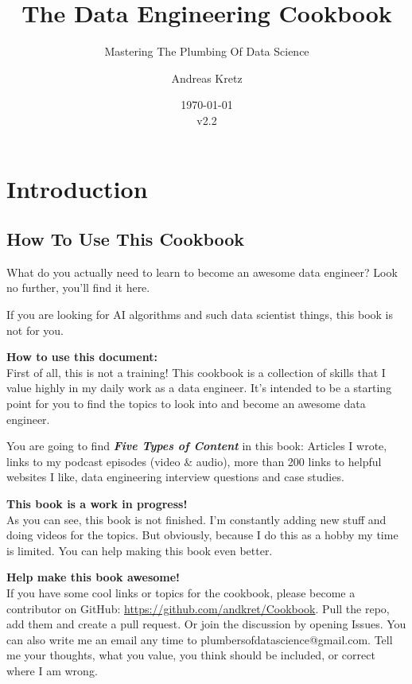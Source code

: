 \documentclass[12pt, numbers=noenddot]{scrreprt} %
\title{The Data Engineering Cookbook}
\subtitle{Mastering The Plumbing Of Data Science}
\author{Andreas Kretz}
\date{\today\\v2.2}
\begin{document}
\maketitle


\pagebreak

\setcounter{tocdepth}{3}
\tableofcontents

\pagebreak

\part{Introduction}
\chapter{How To Use This Cookbook}
What do you actually need to learn to become an awesome data engineer?
Look no further, you'll find it here. 

If you are looking for AI algorithms and such data scientist things, this book is not for you.

\textbf{How to use this document:} \\ 
First of all, this is not a training! This cookbook is a collection of skills that I value highly in my daily work as a data engineer. It's intended to be a starting point for you to find the topics to look into and become an awesome data engineer.

You are going to find \textbf{\textit{Five Types of Content}} in this book: Articles I wrote, links to my podcast episodes (video \& audio), more than 200 links to helpful websites I like, data engineering interview questions and case studies. 

\textbf{This book is a work in progress!} \\
As you can see, this book is not finished. I'm constantly adding new stuff and doing videos for the topics. But obviously, because I do this as a hobby my time is limited. You can help making this book even better.

\textbf{Help make this book awesome!}\\
If you have some cool links or topics for the cookbook, please become a contributor on GitHub: \url{https://github.com/andkret/Cookbook}. Pull the repo, add them and create a pull request. Or join the discussion by opening Issues.
You can also write me an email any time to plumbersofdatascience@gmail.com. Tell me your thoughts, what you value, you think should be included, or correct where I am wrong.
\end{document}
